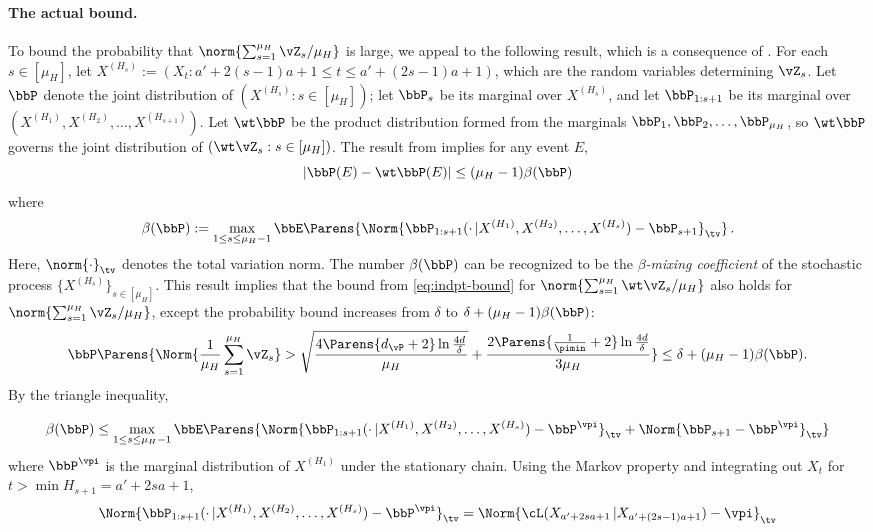 \paragraph{The actual bound.}
To bound the probability that $\norm{\sum_{s=1}^{\mu_H} \vZ_s/\mu_H}$
is large, we appeal to the following result, which is a consequence of
\citep[Corollary 2.7]{Yu94}.
For each $s \in [\mu_H]$, let $X^{(H_s)} := (X_t : a' + 2(s-1)a + 1
\leq t \leq a' + (2s-1)a + 1)$, which are the random variables
determining $\vZ_s$.
Let $\bbP$ denote the joint distribution of $(X^{(H_s)} : s \in
[\mu_H])$; let $\bbP_s$ be its marginal over $X^{(H_s)}$, and let
$\bbP_{1:s+1}$ be its marginal over
$(X^{(H_1)},X^{(H_2)},\dotsc,X^{(H_{s+1})})$.
Let $\wt\bbP$ be the product distribution formed from the marginals
$\bbP_1,\bbP_2,\dotsc,\bbP_{\mu_H}$, so $\wt\bbP$ governs the joint
distribution of $(\wt\vZ_s : s \in [\mu_H])$.
The result from \citep[Corollary 2.7]{Yu94} implies for any event $E$,
\[
  |\bbP(E) - \wt\bbP(E)| \leq (\mu_H-1) \beta(\bbP)
\]
where
\[
  \beta(\bbP)
  :=
  \max_{1 \leq s \leq \mu_H-1}
  \bbE\Parens{
    \Norm{
      \bbP_{1:s+1}(\cdot\,|X^{(H_1)},X^{(H_2)},\dotsc,X^{(H_s)}) - \bbP_{s+1}
    }_{\tv}
  }
  \,.
\]
Here, $\norm{\cdot}_{\tv}$ denotes the total variation norm.
The number $\beta(\bbP)$ can be recognized to be the
\emph{$\beta$-mixing coefficient} of the stochastic process
$\{X^{(H_s)}\}_{s \in [\mu_H]}$.
This result implies that the bound from \cref{eq:indpt-bound} for
$\norm{\sum_{s=1}^{\mu_H} \wt\vZ_s/\mu_H}$ also holds for
$\norm{\sum_{s=1}^{\mu_H} \vZ_s/\mu_H}$, except the probability
bound increases from $\delta$ to $\delta + (\mu_H-1)\beta(\bbP)$:
\begin{equation}
  \bbP\Parens{
    \Norm{ \frac1{\mu_H} \sum_{s=1}^{\mu_H} \vZ_s}
    >
    \sqrt{
      \frac{4\Parens{ d_{\vP} + 2 } \ln\frac{4d}{\delta}}
      {\mu_H}
    }
    + \frac{2\Parens{ \frac1{\pimin} + 2 } \ln\frac{4d}{\delta}}
    {3\mu_H}
  } \leq \delta + (\mu_H-1)\beta(\bbP)
  .
  \label{eq:dpt-bound}
\end{equation}
By the triangle inequality,
\[
  \beta(\bbP)
  \leq
  \max_{1 \leq s \leq \mu_H-1}
  \bbE\Parens{
    \vphantom{\bigg\vert}
    \Norm{
      \bbP_{1:s+1}(\cdot\,|X^{(H_1)},X^{(H_2)},\dotsc,X^{(H_s)})
      - \bbP^{\vpi}
    }_{\tv}
    +
    \Norm{
      \bbP_{s+1}
      - \bbP^{\vpi}
    }_{\tv}
  }
\]
where $\bbP^{\vpi}$ is the marginal distribution of $X^{(H_1)}$ under
the stationary chain.
Using the Markov property and integrating out $X_t$ for $t >
\min H_{s+1} = a'+2sa+1$,
\[
  \Norm{
    \bbP_{1:s+1}(\cdot\,|X^{(H_1)},X^{(H_2)},\dotsc,X^{(H_s)})
    - \bbP^{\vpi}
  }_{\tv}
  =
  \Norm{
    \cL(X_{a'+2sa+1}\,|X_{a'+(2s-1)a+1})
    - \vpi
  }_{\tv}
\]
